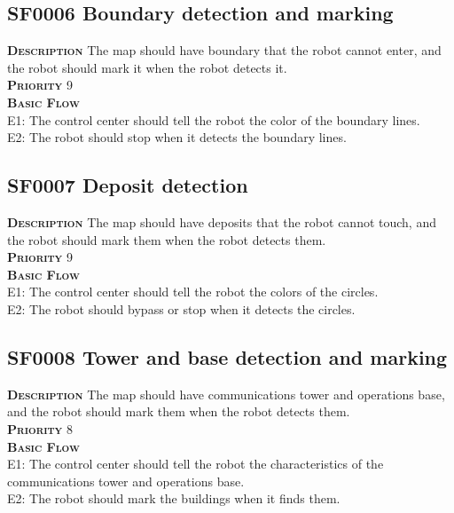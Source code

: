 \documentclass[11pt, a4paper]{article}
\begin{document}
\subsection{SF0006 Boundary detection and marking}
\textsc{\bfseries Description} The map should have boundary that the robot cannot enter, and the robot should mark it when the robot detects it.\\
\textsc{\bfseries Priority} 9\\
\textsc{\bfseries Basic Flow} \\
\textsc{E1:} The control center should tell the robot the color of the boundary lines.\\
\textsc{E2:} The robot should stop when it detects the boundary lines.\\

\subsection{SF0007 Deposit detection}
\textsc{\bfseries Description} The map should have deposits that the robot cannot touch, and the robot should mark them when the robot detects them.\\
\textsc{\bfseries Priority} 9\\
\textsc{\bfseries Basic Flow} \\
\textsc{E1:} The control center should tell the robot the colors of the circles.\\
\textsc{E2:} The robot should bypass or stop when it detects the circles.\\

\subsection{SF0008 Tower and base detection and marking}
\textsc{\bfseries Description} The map should have communications tower and operations base, and the robot should mark them when the robot detects them.\\
\textsc{\bfseries Priority} 8\\
\textsc{\bfseries Basic Flow} \\
\textsc{E1:} The control center should tell the robot the characteristics of the communications tower and operations base.\\
\textsc{E2:} The robot should mark the buildings when it finds them.\\
\end{document}
